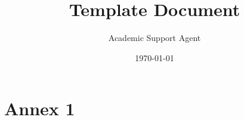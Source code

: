\documentclass{article}
\title{Template Document}
\author{Academic Support Agent}
\date{\today}
\begin{document}
\maketitle





\setmainfont{Carlito}





\renewcommand{\listfigurename}{List of Figures} %

\renewcommand{\listtablename}{List of Tables} %

\listofalgorithms   %
\listofcodes	    %



\pagestyle{fancy}

 

 

 


\chapter{Annex 1}
\lipsum[1-2]


\thispagestyle{empty}



 
\end{document}
